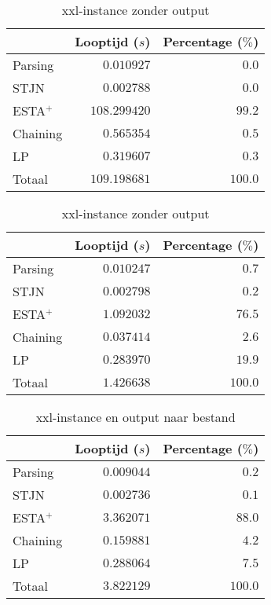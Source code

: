\begin{table}[H]
\parbox{.45\linewidth}{
    \centering
    \begin{tabular}{| l | r | r |}
        \hline
                    & Looptijd ($s$)  & Percentage ($\%$) \\
        \hline
        Parsing     & $0.010927$      & $0.0$   \\
        STJN        & $0.002788$      & $0.0$   \\
        ESTA$^+$    & $108.299420$    & $99.2$  \\
        Chaining    & $0.565354$      & $0.5$   \\
        LP          & $0.319607$      & $0.3$   \\
        \hline \hline
        Totaal      & $109.198681$    & $100.0$ \\
        \hline
    \end{tabular}
    \caption{xxl-instance met output}
    \label{tbl:xxl+output}
}
\hfill
\parbox{.45\linewidth}{
    \centering
    \begin{tabular}{| l | r | r |}
        \hline
                    & Looptijd ($s$)& Percentage ($\%$) \\
        \hline
        Parsing     & $0.010247$      & $0.7$   \\
        STJN        & $0.002798$      & $0.2$   \\
        ESTA$^+$    & $1.092032$      & $76.5$  \\
        Chaining    & $0.037414$      & $2.6$   \\
        LP          & $0.283970$      & $19.9$  \\
        \hline \hline
        Totaal      & $1.426638$      & $100.0$ \\
        \hline
    \end{tabular}
    \caption{xxl-instance zonder output}
    \label{tbl:xxl-output}
}
\end{table}

\begin{table}[H]
    \centering
    \begin{tabular}{| l | r | r|}
        \hline
                    & Looptijd ($s$)& Percentage ($\%$) \\
        \hline
        
        Parsing     & $0.009044$    & $0.2$     \\
        STJN        & $0.002736$    & $0.1$     \\
        ESTA$^+$    & $3.362071$    & $88.0$    \\
        Chaining    & $0.159881$    & $4.2$     \\
        LP          & $0.288064$    & $7.5$     \\
        \hline \hline
        Totaal      & $3.822129$    & $100.0$   \\
        \hline
    \end{tabular}
    \caption{xxl-instance en output naar bestand}
    \label{tbl:xxl+outputbestand}
\end{table}

